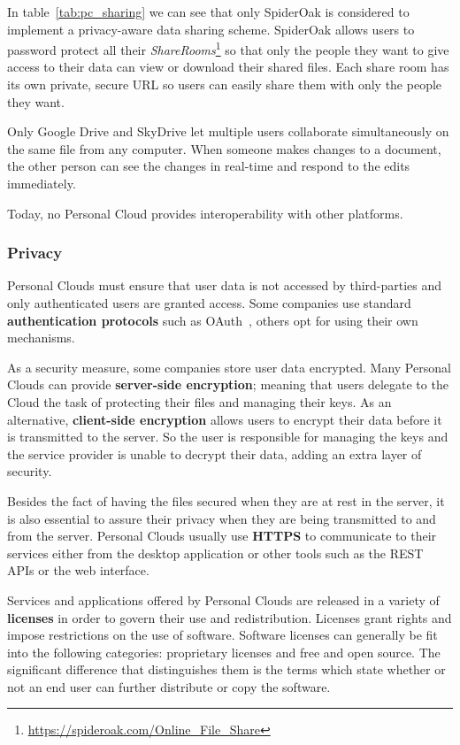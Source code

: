 In table~\ref{tab:pc_sharing} we can see that only SpiderOak is considered to implement a privacy-aware data sharing scheme. SpiderOak allows users to password protect all their \textit{ShareRooms}\footnote{\url{https://spideroak.com/Online_File_Share}} so that only the people they want to give access to their data can view or download their shared files. Each share room has its own private, secure URL so users can easily share them with only the people they want.


Only Google Drive and SkyDrive let multiple users collaborate simultaneously on the same file from any computer. When someone makes changes to a document, the other person can see the changes in real-time and respond to the edits immediately.

Today, no Personal Cloud provides interoperability with other platforms.


\subsubsection{Privacy}


Personal Clouds must ensure that user data is not accessed by third-parties and only authenticated users are granted access. Some companies use standard \textbf{authentication protocols} such as OAuth~\cite{oauth}, others opt for using their own mechanisms.

As a security measure, some companies store user data encrypted. Many Personal Clouds can provide \textbf{server-side encryption}; meaning that users delegate to the Cloud the task of protecting their files and managing their keys. As an alternative, \textbf{client-side encryption} allows users to encrypt their data before it is transmitted to the server. So the user is responsible for managing the keys and the service provider is unable to decrypt their data, adding an extra layer of security.

Besides the fact of having the files secured when they are at rest in the server, it is also essential to assure their privacy when they are being transmitted to and from the server. Personal Clouds usually use \textbf{HTTPS} to communicate to their services either from the desktop application or other tools such as the REST APIs or the web interface.

Services and applications offered by Personal Clouds are released in a variety of \textbf{licenses} in order to govern their use and redistribution. Licenses grant rights and impose restrictions on the use of software. Software licenses can generally be fit into the following categories: proprietary licenses and free and open source. The significant difference that distinguishes them is the terms which state whether or not an end user can further distribute or copy the software.


